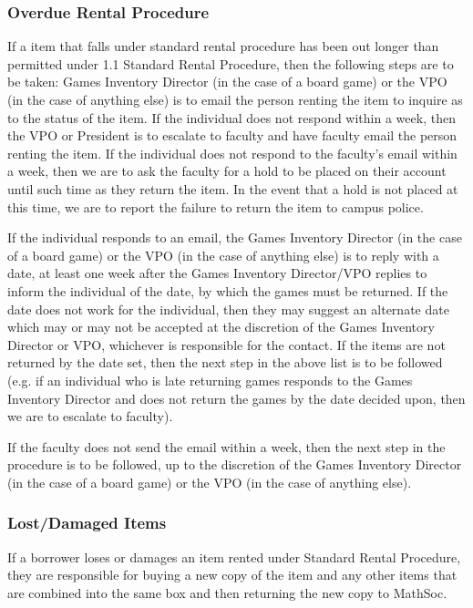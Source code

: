 \subsubsection{Overdue Rental Procedure}
If a item that falls under standard rental procedure has been out longer than permitted under 1.1 Standard Rental Procedure, then the following steps are to be taken:
Games Inventory Director (in the case of a board game) or the VPO (in the case of anything else) is to email the person renting the item to inquire as to the status of the item.
If the individual does not respond within a week, then the VPO or President is to escalate to faculty and have faculty email the person renting the item.
If the individual does not respond to the faculty's email within a week, then we are to ask the faculty for a hold to be placed on their account until such time as they return the item. In the event that a hold is not placed at this time, we are to report the failure to return the item to campus police.

If the individual responds to an email, the Games Inventory Director (in the case of a board game) or the VPO (in the case of anything else) is to reply with a date, at least one week after the Games Inventory Director/VPO replies to inform the individual of the date, by which the games must be returned. If the date does not work for the individual, then they may suggest an alternate date which may or may not be accepted at the discretion of the Games Inventory Director or VPO, whichever is responsible for the contact. If the items are not returned by the date set, then the next step in the above list is to be followed (e.g. if an individual who is late returning games responds to the Games Inventory Director and does not return the games by the date decided upon, then we are to escalate to faculty).

If the faculty does not send the email within a week, then the next step in the procedure is to be followed, up to the discretion of the Games Inventory Director (in the case of a board game) or the VPO (in the case of anything else).

\subsubsection{Lost/Damaged Items}
If a borrower loses or damages an item rented under Standard Rental Procedure, they are responsible for buying a new copy of the item and any other items that are combined into the same box and then returning the new copy to MathSoc.

